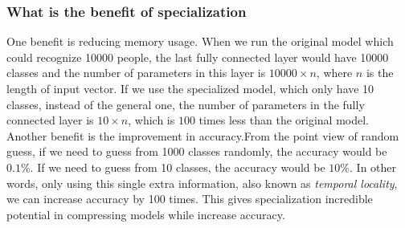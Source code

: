\documentclass{article}
\begin{document}
\subsubsection{What is the benefit of specialization}
One benefit is reducing memory usage. When we run the original model which could recognize 10000 people, the last fully connected layer would have 10000 classes and the number of parameters in this layer is $10000 \times n$, where $n$ is the length of input vector. If we use the specialized model, which only have 10 classes, instead of the general one, the number of parameters in the fully connected layer is $10 \times n$, which is $100$ times less than the original model.
Another benefit is the improvement in accuracy.From the point view of random guess, if we need to guess from 1000 classes randomly, the accuracy would be $0.1\%$. If we need to guess from 10 classes, the accuracy would be $10\%$. In other words, only using this single extra information, also known as \textit{temporal locality}, we can increase accuracy by 100 times. This gives specialization incredible potential in compressing models while increase accuracy.
\end{document}
